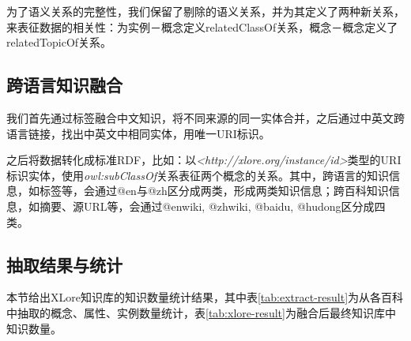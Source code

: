 
为了语义关系的完整性，我们保留了剔除的语义关系，并为其定义了两种新关系，来表征数据的相关性：为实例－概念定义relatedClassOf关系，概念－概念定义了relatedTopicOf关系。

\subsection{跨语言知识融合}
            

我们首先通过标签融合中文知识，将不同来源的同一实体合并，之后通过中英文跨语言链接，找出中英文中相同实体，用唯一URI标识。

之后将数据转化成标准RDF，比如：以\textit{<http://xlore.org/instance/id>}类型的URI标识实体，使用\textit{owl:subClassOf}关系表征两个概念的关系。其中，跨语言的知识信息，如标签等，会通过@en与@zh区分成两类，形成两类知识信息；跨百科知识信息，如摘要、源URL等，会通过@enwiki, @zhwiki, @baidu, @hudong区分成四类。

\subsection{抽取结果与统计}
本节给出XLore知识库的知识数量统计结果，其中表\ref{tab:extract-result}为从各百科中抽取的概念、属性、实例数量统计，表\ref{tab:xlore-result}为融合后最终知识库中知识数量。

